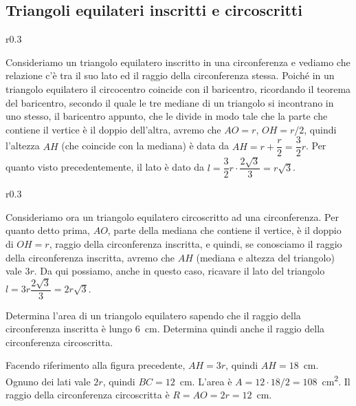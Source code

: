 
\subsection{Triangoli equilateri inscritti e circoscritti}

\setlength{\intextsep}{3pt plus 2.0pt minus 2.0pt}
\begin{wrapfigure}{r}{0.3\textwidth}
	\centering
\end{wrapfigure}
Consideriamo un triangolo equilatero inscritto in una circonferenza e vediamo che relazione c'è tra il suo lato ed il raggio della circonferenza stessa.
Poiché in un triangolo equilatero il circocentro coincide con il baricentro, ricordando il teorema del baricentro, secondo il quale le tre mediane di un triangolo si incontrano in uno stesso, il baricentro appunto, che le divide in modo tale che la parte che contiene il vertice è il doppio dell'altra, avremo che $AO = r$, $OH = r/2$, quindi l'altezza $AH$ (che coincide con la mediana) è data da $AH = r+\dfrac{r}{2}=\dfrac{3}{2}r$.
Per quanto visto precedentemente, il lato è dato da $l=\dfrac{3}{2}r\cdot\dfrac{2\sqrt{3}}{3}=r\sqrt{3}$. 

\begin{wrapfigure}{r}{0.3\textwidth}
	\centering
\end{wrapfigure}
Consideriamo ora un triangolo equilatero circoscritto ad una circonferenza.
Per quanto detto prima, $AO$, parte della mediana che contiene il vertice, è il doppio di $OH = r$, raggio della circonferenza inscritta, e quindi, se conosciamo il raggio della circonferenza inscritta, avremo che $AH$ (mediana e altezza del triangolo) vale $3r$. Da qui possiamo, anche in questo caso, ricavare il lato del triangolo $l=3r\dfrac{2\sqrt{3}}{3}=2r\sqrt{3}$.

\begin{exrig}
\begin{esempio}
Determina l'area di un triangolo equilatero sapendo che il raggio della circonferenza inscritta è lungo 6~cm. Determina quindi anche il raggio della circonferenza circoscritta.\vspace{7pt}

Facendo riferimento alla figura precedente, $AH=3r$, quindi $AH = 18$~cm. 
Ognuno dei lati vale $2r$, quindi $BC = 12$~cm.
L'area è $A = 12\cdot 18 / 2 = 108$~cm\textsuperscript{2}.
Il raggio della circonferenza circoscritta è $R= AO = 2r = 12$~cm.
\end{esempio}
\end{exrig}

